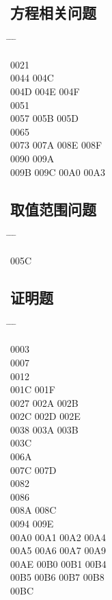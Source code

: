 \documentclass[twoside, twocolumn]{ctexart}
\newenvironment{problist}{
  \begin{center} \ttfamily \begin{tabbing}
      \hspace{50pt} \= \hspace{50pt} \= \hspace{50pt} \= \kill
  }{ \end{tabbing} \end{center} }
\begin{document}
  \subsection*{方程相关问题}

  \begin{problist}
    0021    \\ 0044   \> 004C \\
    004D \> 004E \> 004F  \\ 0051    \\
    0057 \> 005B \> 005D  \\ 0065    \\
    0073 \> 007A \> 008E \> 008F \\ 0090   \> 009A \\
    009B \> 009C \> 00A0 \> 00A3 \\
  \end{problist}

  \subsection*{取值范围问题}

  \begin{problist}
    005C   \\
  \end{problist}

  \subsection*{证明题}

  \begin{problist}
    0003    \\ 0007    \\
    0012    \\ 001C \> 001F   \\
    0027  \> 002A \> 002B \\ 002C \> 002D \> 002E  \\
    0038  \> 003A \> 003B \\ 003C    \\
    006A    \\ 007C \> 007D   \\
    0082    \\ 0086    \\
    008A \> 008C   \\ 0094   \> 009E \\
    00A0 \> 00A1 \> 00A2 \> 00A4 \\ 00A5 \> 00A6 \> 00A7 \> 00A9 \\
    00AE \> 00B0 \> 00B1 \> 00B4 \\ 00B5 \> 00B6 \> 00B7 \> 00B8 \\
    00BC \\
  \end{problist}
\end{document}
